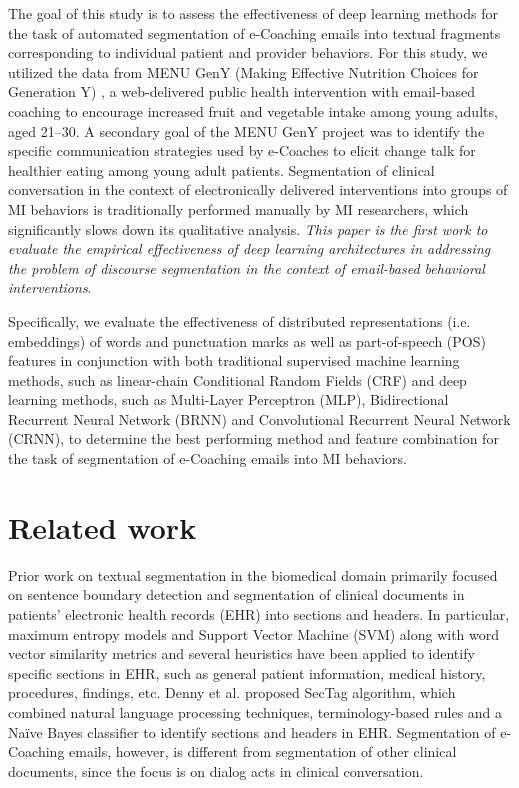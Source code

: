 \documentclass{amia}
\begin{document}
The goal of this study is to assess the effectiveness of deep learning methods for the task of automated segmentation of e-Coaching emails into textual fragments corresponding to individual patient and provider behaviors.  For this study, we utilized the data from MENU GenY (Making Effective Nutrition Choices for Generation Y) \cite{alexander2017motivations}, a web-delivered public health intervention with email-based coaching to encourage increased fruit and vegetable intake among young adults, aged 21–30. A secondary goal of the MENU GenY project was to identify the specific communication strategies used by e-Coaches to elicit change talk for healthier eating among young adult patients. Segmentation of clinical conversation in the context of electronically delivered interventions into groups of MI behaviors is traditionally performed manually by MI researchers, which significantly slows down its qualitative analysis. \textit{This paper is the first work to evaluate the empirical effectiveness of deep learning architectures in addressing the problem of discourse segmentation in the context of email-based behavioral interventions}. 

Specifically, we evaluate the effectiveness of distributed representations (i.e. embeddings) of words and punctuation marks as well as part-of-speech (POS) features in conjunction with both traditional supervised machine learning methods, such as linear-chain Conditional Random Fields (CRF)\cite{lafferty2001conditional} and deep learning methods, such as Multi-Layer Perceptron (MLP),\cite{rumelhart1986learning} Bidirectional Recurrent Neural Network (BRNN)\cite{schuster1997bidirectional} and Convolutional Recurrent Neural Network (CRNN),\cite{treviso2017sentence} to determine the best performing method and feature combination for the task of segmentation of e-Coaching emails into MI behaviors. 

\section*{Related work}

Prior work on textual segmentation in the biomedical domain primarily focused on sentence boundary detection \cite{griffis2016quantitative,kreuzthaler2015detection,treviso2017sentence} and segmentation of clinical documents in patients' electronic health records (EHR) into sections and headers. \cite{apostolova2009automatic,denny2009evaluation,tepper2012statistical,cho2002text} In particular, maximum entropy models \cite{tepper2012statistical} and Support Vector Machine (SVM) along with word vector similarity metrics and several heuristics \cite{apostolova2009automatic} have been applied to identify specific sections in EHR, such as general patient information, medical history, procedures, findings, etc. Denny et al. \cite{denny2009evaluation} proposed SecTag algorithm, which combined natural language processing techniques, terminology-based rules and a Na\"{i}ve Bayes classifier to identify sections and headers in EHR. Segmentation of e-Coaching emails, however, is different from segmentation of other clinical documents, since the focus is on dialog acts in clinical conversation.   
\end{document}

